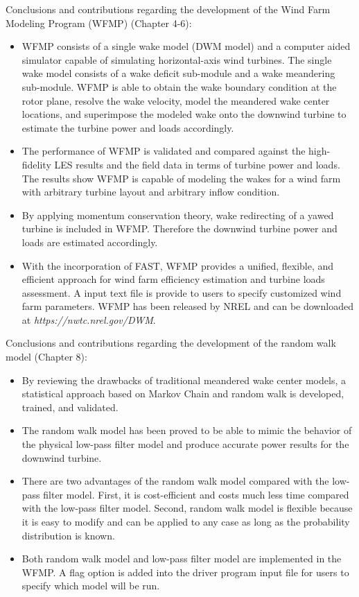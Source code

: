 \documentclass{umthesis}
\begin{document}
Conclusions and contributions regarding the development of the Wind Farm Modeling Program (WFMP) (Chapter 4-6):
\begin{itemize}
  \item WFMP consists of a single wake model (DWM model) and a computer aided simulator capable of simulating horizontal-axis wind turbines. The single wake model consists of a wake deficit sub-module and a wake meandering sub-module. WFMP is able to obtain the wake boundary condition at the rotor plane, resolve the wake velocity, model the meandered wake center locations, and superimpose the modeled wake onto the downwind turbine to estimate the turbine power and loads accordingly.
  \item The performance of WFMP is validated and compared against the high-fidelity LES results and the field data in terms of turbine power and loads. The results show WFMP is capable of modeling the wakes for a wind farm with arbitrary turbine layout and arbitrary inflow condition.
  \item By applying momentum conservation theory, wake redirecting of a yawed turbine is included in WFMP. Therefore the downwind turbine power and loads are estimated accordingly.
  \item With the incorporation of FAST, WFMP provides a unified, flexible, and efficient approach for wind farm efficiency estimation and turbine loads assessment. A input text file is provide to users to specify customized wind farm parameters. WFMP has been released by NREL and can be downloaded at \textit{https://nwtc.nrel.gov/DWM}.     
\end{itemize}

Conclusions and contributions regarding the development of the random walk model (Chapter 8):
\begin{itemize}
  \item By reviewing the drawbacks of traditional meandered wake center models, a statistical approach based on Markov Chain and random walk is developed, trained, and validated.
  \item The random walk model has been proved to be able to mimic the behavior of the physical low-pass filter model and produce accurate power results for the downwind turbine.
  \item There are two advantages of the random walk model compared with the low-pass filter model. First, it is cost-efficient and costs much less time compared with the low-pass filter model. Second, random walk model is flexible because it is easy to modify and can be applied to any case as long as the probability distribution is known. 
  \item Both random walk model and low-pass filter model are implemented in the WFMP. A flag option is added into the driver program input file for users to specify which model will be run.
\end{itemize}
\end{document}
